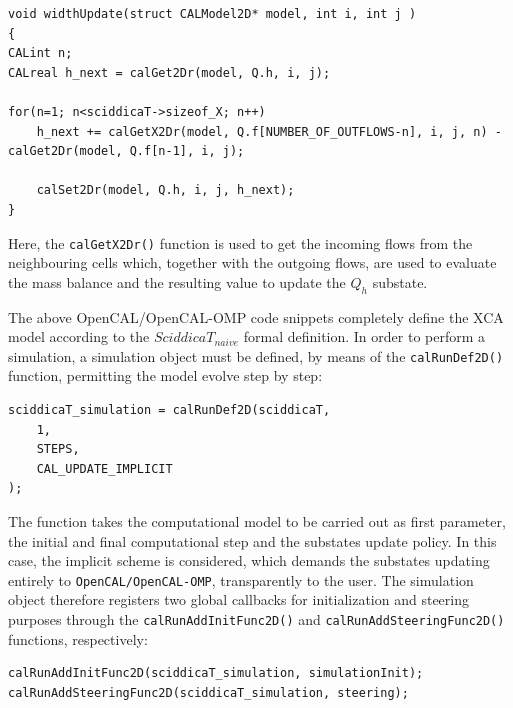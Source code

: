 \begin{lstlisting}
void widthUpdate(struct CALModel2D* model, int i, int j )
{
CALint n;
CALreal h_next = calGet2Dr(model, Q.h, i, j);

for(n=1; n<sciddicaT->sizeof_X; n++)
	h_next += calGetX2Dr(model, Q.f[NUMBER_OF_OUTFLOWS-n], i, j, n) - calGet2Dr(model, Q.f[n-1], i, j);

	calSet2Dr(model, Q.h, i, j, h_next);
}
\end{lstlisting}

\noindent Here, the \verb'calGetX2Dr()' function is used to get the
incoming flows from the neighbouring cells which, together with the
outgoing flows, are used to evaluate the mass balance and the
resulting value to update the $Q_h$ substate.

The above OpenCAL/OpenCAL-OMP code snippets completely define the
XCA model according to the $SciddicaT_{naive}$ formal definition. In
order to perform a simulation, a simulation object must be defined,
by means of the \verb'calRunDef2D()' function, permitting the model
evolve step by step:

\begin{lstlisting}
sciddicaT_simulation = calRunDef2D(sciddicaT,
	1,
	STEPS,
	CAL_UPDATE_IMPLICIT
);
\end{lstlisting}

\noindent The function takes the computational model to be carried out as
first parameter, the initial and final computational step and the
substates update policy. In this case, the implicit scheme is
considered, which demands the substates updating entirely to
\texttt{OpenCAL/OpenCAL-OMP}, transparently to the user. The simulation
object therefore registers two global callbacks for initialization
and steering purposes through the \verb'calRunAddInitFunc2D()' and
\verb'calRunAddSteeringFunc2D()' functions, respectively:

\begin{lstlisting}
calRunAddInitFunc2D(sciddicaT_simulation, simulationInit);
calRunAddSteeringFunc2D(sciddicaT_simulation, steering);
\end{lstlisting}

